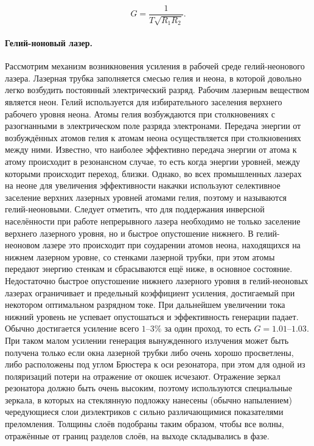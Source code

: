 \documentclass[a4paper,12pt]{article} %
\begin{document}
\[ G=\frac{1}{T\sqrt{R_1R_2}}. \]

\paragraph{Гелий-ноновый лазер.} Рассмотрим механизм возникновения усиления в рабочей среде гелий-неонового лазера. Лазерная трубка заполняется смесью гелия и неона, в
которой довольно легко возбудить постоянный электрический разряд. Рабочим лазерным веществом является неон. Гелий используется для избирательного заселения верхнего рабочего уровня неона. Атомы гелия возбуждаются при столкновениях с разогнанными в электрическом поле разряда электронами. Передача энергии от возбуждённых атомов гелия к атомам неона осуществляется при столкновениях между ними. Известно, что наиболее эффективно передача энергии от атома к атому происходит в резонансном случае, то есть когда энергии уровней, между которыми происходит переход, близки. Однако, во всех промышленных лазерах на неоне для увеличения эффективности накачки используют селективное заселение верхних лазерных уровней атомами гелия, поэтому
и называются гелий-неоновыми. Следует отметить, что для поддержания инверсной населённости при работе непрерывного лазера необходимо не только заселение верхнего лазерного уровня, но и быстрое опустошение нижнего. В гелий-неоновом лазере это происходит при соударении атомов неона, находящихся на нижнем лазерном уровне, со стенками лазерной трубки, при этом атомы передают энергию стенкам и сбрасываются ещё ниже, в основное состояние. Недостаточно быстрое опустошение нижнего лазерного уровня в гелий-неоновых лазерах ограничивает и предельный коэффициент усиления, достигаемый при некотором оптимальном разрядном токе. При дальнейшем увеличении тока нижний уровень не успевает опустошаться и эффективность генерации падает. Обычно достигается усиление всего $1–3\%$ за один проход, то есть $G=1.01 – 1.03$. При таком малом усилении генерация вынужденного излучения может быть получена только если окна лазерной трубки либо очень хорошо просветлены, либо расположены под углом Брюстера к оси резонатора, при этом для одной из поляризаций потери на отражение от окошек исчезают. Отражение зеркал резонатора должно быть очень высоким, поэтому используются специальные зеркала, в которых на стеклянную подложку нанесены (обычно напылением) чередующиеся слои диэлектриков с сильно различающимися показателями преломления. Толщины слоёв подобраны таким образом, чтобы все волны, отражённые от границ разделов слоёв, на выходе складывались в фазе.
\end{document}
